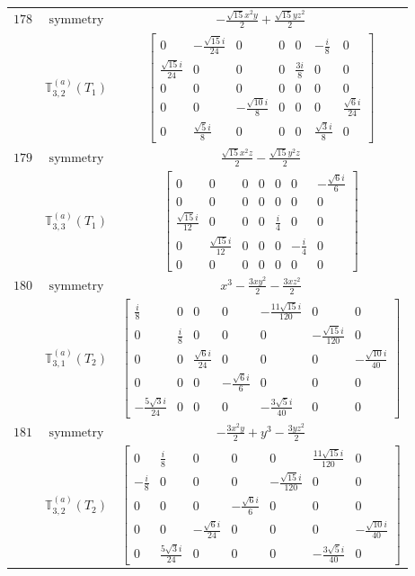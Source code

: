 \documentclass[fleqn,8pt,landscape]{jsarticle}
\begin{document}
\begin{longtable}{ccc}
$ 178 $ & $ \text{symmetry} $ & $ - \frac{\sqrt{15} x^{2} y}{2} + \frac{\sqrt{15} y z^{2}}{2} $ \\
$  $ & $ \mathbb{T}_{3,2}^{(a)}(T_{1}) $ & $ \begin{bmatrix} 0 & - \frac{\sqrt{15} i}{24} & 0 & 0 & 0 & - \frac{i}{8} & 0 \\ \frac{\sqrt{15} i}{24} & 0 & 0 & 0 & \frac{3 i}{8} & 0 & 0 \\ 0 & 0 & 0 & 0 & 0 & 0 & 0 \\ 0 & 0 & - \frac{\sqrt{10} i}{8} & 0 & 0 & 0 & \frac{\sqrt{6} i}{24} \\ 0 & \frac{\sqrt{5} i}{8} & 0 & 0 & 0 & \frac{\sqrt{3} i}{8} & 0 \end{bmatrix} $ \\ \hline
$ 179 $ & $ \text{symmetry} $ & $ \frac{\sqrt{15} x^{2} z}{2} - \frac{\sqrt{15} y^{2} z}{2} $ \\
$  $ & $ \mathbb{T}_{3,3}^{(a)}(T_{1}) $ & $ \begin{bmatrix} 0 & 0 & 0 & 0 & 0 & 0 & - \frac{\sqrt{6} i}{6} \\ 0 & 0 & 0 & 0 & 0 & 0 & 0 \\ \frac{\sqrt{15} i}{12} & 0 & 0 & 0 & \frac{i}{4} & 0 & 0 \\ 0 & \frac{\sqrt{15} i}{12} & 0 & 0 & 0 & - \frac{i}{4} & 0 \\ 0 & 0 & 0 & 0 & 0 & 0 & 0 \end{bmatrix} $ \\ \hline
$ 180 $ & $ \text{symmetry} $ & $ x^{3} - \frac{3 x y^{2}}{2} - \frac{3 x z^{2}}{2} $ \\
$  $ & $ \mathbb{T}_{3,1}^{(a)}(T_{2}) $ & $ \begin{bmatrix} \frac{i}{8} & 0 & 0 & 0 & - \frac{11 \sqrt{15} i}{120} & 0 & 0 \\ 0 & \frac{i}{8} & 0 & 0 & 0 & - \frac{\sqrt{15} i}{120} & 0 \\ 0 & 0 & \frac{\sqrt{6} i}{24} & 0 & 0 & 0 & - \frac{\sqrt{10} i}{40} \\ 0 & 0 & 0 & - \frac{\sqrt{6} i}{6} & 0 & 0 & 0 \\ - \frac{5 \sqrt{3} i}{24} & 0 & 0 & 0 & - \frac{3 \sqrt{5} i}{40} & 0 & 0 \end{bmatrix} $ \\ \hline
$ 181 $ & $ \text{symmetry} $ & $ - \frac{3 x^{2} y}{2} + y^{3} - \frac{3 y z^{2}}{2} $ \\
$  $ & $ \mathbb{T}_{3,2}^{(a)}(T_{2}) $ & $ \begin{bmatrix} 0 & \frac{i}{8} & 0 & 0 & 0 & \frac{11 \sqrt{15} i}{120} & 0 \\ - \frac{i}{8} & 0 & 0 & 0 & - \frac{\sqrt{15} i}{120} & 0 & 0 \\ 0 & 0 & 0 & - \frac{\sqrt{6} i}{6} & 0 & 0 & 0 \\ 0 & 0 & - \frac{\sqrt{6} i}{24} & 0 & 0 & 0 & - \frac{\sqrt{10} i}{40} \\ 0 & \frac{5 \sqrt{3} i}{24} & 0 & 0 & 0 & - \frac{3 \sqrt{5} i}{40} & 0 \end{bmatrix} $ \\ \hline

\end{longtable}
\end{document}
